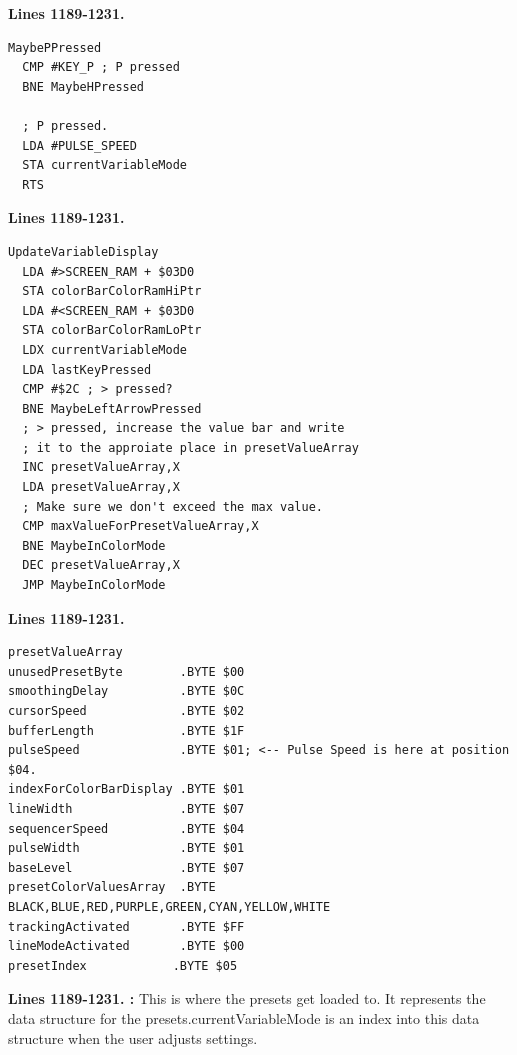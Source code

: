 \clearpage
\textbf{Lines 1189-1231. } 
\begin{lstlisting}[caption=From \icode{CheckKeyboardInput}.]
MaybePPressed   
  CMP #KEY_P ; P pressed
  BNE MaybeHPressed

  ; P pressed.
  LDA #PULSE_SPEED
  STA currentVariableMode
  RTS 
\end{lstlisting}
\textbf{Lines 1189-1231. } 
\begin{lstlisting}[caption=From \icode{CheckKeyboardInputForActiveVariable}. Pressing the \icode{<} and > keys increments and
decrements the value in presetValueArray pointed to by \icode{X}\, i.e. \icode{currentVariableMode}.]
UpdateVariableDisplay   
  LDA #>SCREEN_RAM + $03D0
  STA colorBarColorRamHiPtr
  LDA #<SCREEN_RAM + $03D0
  STA colorBarColorRamLoPtr
  LDX currentVariableMode
  LDA lastKeyPressed
  CMP #$2C ; > pressed?
  BNE MaybeLeftArrowPressed
  ; > pressed, increase the value bar and write
  ; it to the approiate place in presetValueArray
  INC presetValueArray,X
  LDA presetValueArray,X
  ; Make sure we don't exceed the max value.
  CMP maxValueForPresetValueArray,X
  BNE MaybeInColorMode
  DEC presetValueArray,X
  JMP MaybeInColorMode
\end{lstlisting}
\textbf{Lines 1189-1231. } 
\begin{lstlisting}[basicstyle=\ttfamily\scriptsize,caption=From \icode{ActivateSequencer}.]
presetValueArray
unusedPresetByte        .BYTE $00
smoothingDelay          .BYTE $0C
cursorSpeed             .BYTE $02
bufferLength            .BYTE $1F
pulseSpeed              .BYTE $01; <-- Pulse Speed is here at position $04.
indexForColorBarDisplay .BYTE $01
lineWidth               .BYTE $07
sequencerSpeed          .BYTE $04 
pulseWidth              .BYTE $01
baseLevel               .BYTE $07
presetColorValuesArray  .BYTE BLACK,BLUE,RED,PURPLE,GREEN,CYAN,YELLOW,WHITE
trackingActivated       .BYTE $FF
lineModeActivated       .BYTE $00
presetIndex            .BYTE $05
\end{lstlisting}
\clearpage

\textbf{Lines 1189-1231. :} 
 This is where the presets get loaded to. It represents the data structure
 for the presets.currentVariableMode is an index into this data structure
 when the user adjusts settings.
\clearpage


